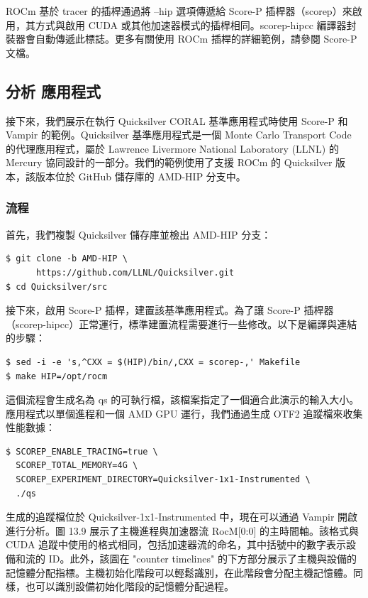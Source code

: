 ROCm 基於 tracer 的插桿通過將 --hip 選項傳遞給 Score-P 插桿器（scorep）來啟用，其方式與啟用 CUDA 或其他加速器模式的插桿相同。scorep-hipcc 編譯器封裝器會自動傳遞此標誌。更多有關使用 ROCm 插桿的詳細範例，請參閱 Score-P 文檔。

\subsection{分析 \Quicksilver 應用程式}
接下來，我們展示在執行 Quicksilver CORAL 基準應用程式時使用 Score-P 和 Vampir 的範例。Quicksilver 基準應用程式是一個 Monte Carlo Transport Code 的代理應用程式，屬於 Lawrence Livermore National Laboratory (LLNL) 的 Mercury 協同設計的一部分。我們的範例使用了支援 ROCm 的 Quicksilver 版本，該版本位於 GitHub 儲存庫的 AMD-HIP 分支中。

\subsubsection{流程}
首先，我們複製 Quicksilver 儲存庫並檢出 AMD-HIP 分支：
\begin{lstlisting}
$ git clone -b AMD-HIP \
      https:∕∕github.com∕LLNL∕Quicksilver.git
$ cd Quicksilver∕src
\end{lstlisting}

接下來，啟用 Score-P 插桿，建置該基準應用程式。為了讓 Score-P 插桿器（scorep-hipcc）正常運行，標準建置流程需要進行一些修改。以下是編譯與連結的步驟：

\begin{lstlisting}
$ sed -i -e 's,^CXX = $(HIP)∕bin∕,CXX = scorep-,' Makefile
$ make HIP=∕opt∕rocm
\end{lstlisting}



這個流程會生成名為 qs 的可執行檔，該檔案指定了一個適合此演示的輸入大小。應用程式以單個進程和一個 AMD GPU 運行，我們通過生成 OTF2 追蹤檔來收集性能數據：
\begin{lstlisting}
$ SCOREP_ENABLE_TRACING=true \
  SCOREP_TOTAL_MEMORY=4G \
  SCOREP_EXPERIMENT_DIRECTORY=Quicksilver-1x1-Instrumented \
  .∕qs
\end{lstlisting}

生成的追蹤檔位於 Quicksilver-1x1-Instrumented 中，現在可以通過 Vampir 開啟進行分析。圖 13.9 展示了主機進程與加速器流 RocM[0:0] 的主時間軸。該格式與 CUDA 追蹤中使用的格式相同，包括加速器流的命名，其中括號中的數字表示設備和流的 ID。此外，該圖在 "counter timelines" 的下方部分展示了主機與設備的記憶體分配指標。主機初始化階段可以輕鬆識別，在此階段會分配主機記憶體。同樣，也可以識別設備初始化階段的記憶體分配過程。

